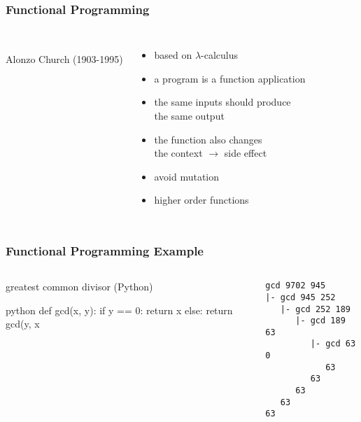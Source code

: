 \documentclass[dvipsnames]{beamer}
\theoremstyle{plain}
\begin{document}
\begin{frame}
  \frametitle{Functional Programming}

  \begin{columns}
    \begin{center}
      \\
      Alonzo Church (1903-1995)
    \end{center}

    \begin{itemize}
      \item based on $\lambda$-calculus
      \item a program is a function application
      \item the same inputs should produce\\
        the same output

      \pause
      \medskip
      \item the function also changes\\
        the context $\rightarrow$ \alert{side effect}
      \item avoid mutation

      \pause
      \medskip
      \item higher order functions
    \end{itemize}
  \end{columns}
\end{frame}

\begin{frame}[fragile]
  \frametitle{Functional Programming Example}

  \begin{columns}
    \begin{exampleblock}{greatest common divisor (Python)}
      \begin{pygments}{python}
def gcd(x, y):
    if y == 0:
        return x
    else:
        return gcd(y, x %
      \end{pygments}
    \end{exampleblock}

    \begin{verbatim}
gcd 9702 945
|- gcd 945 252
   |- gcd 252 189
      |- gcd 189 63
         |- gcd 63 0
            63
         63
      63
   63
63
    \end{verbatim}
  \end{columns}
\end{frame}
\end{document}
